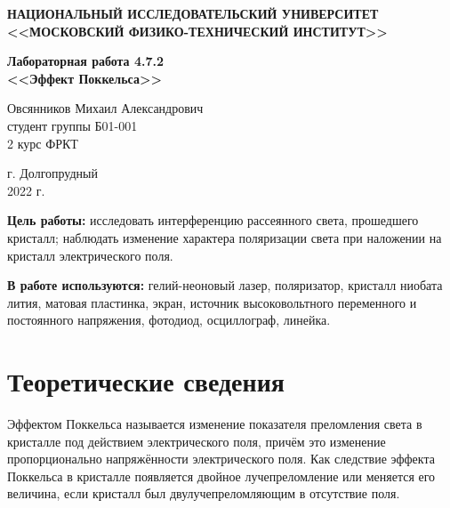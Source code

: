 \documentclass[a4paper,12pt]{article} %
\begin{document}
	
	
	\begin{center}
		
		
		\textbf{НАЦИОНАЛЬНЫЙ ИССЛЕДОВАТЕЛЬСКИЙ УНИВЕРСИТЕТ \\ <<МОСКОВСКИЙ ФИЗИКО-ТЕХНИЧЕСКИЙ ИНСТИТУТ>>}
		\vspace{13ex}
		
		\textbf{Лабораторная работа 4.7.2\\ <<Эффект Поккельса>>}
		\vspace{40ex}
		
		\normalsize{Овсянников Михаил Александрович \\ студент группы Б01-001\\ 2 курс ФРКТ\\}
	\end{center}
	
	\vfill 
	
	\begin{center}
		г. Долгопрудный\\ 
		2022 г.
	\end{center}
	
	
	\thispagestyle{empty} %
	\newpage
	
	\textbf{Цель работы:} исследовать интерференцию рассеянного света, прошедшего кристалл; наблюдать изменение характера поляризации света при наложении на кристалл электрического поля.
	
	\textbf{В работе используются:} гелий-неоновый лазер, поляризатор, кристалл ниобата лития, матовая пластинка, экран, источник высоковольтного переменного и постоянного напряжения, фотодиод, осциллограф, линейка.
	
	\section*{Теоретические сведения}
	Эффектом Поккельса называется изменение показателя преломления света в кристалле под действием электрического поля, причём это изменение пропорционально напряжённости электрического поля. Как следствие эффекта Поккельса в кристалле появляется двойное лучепреломление или меняется его величина, если кристалл был двулучепреломляющим в отсутствие поля.
	
\end{document}
